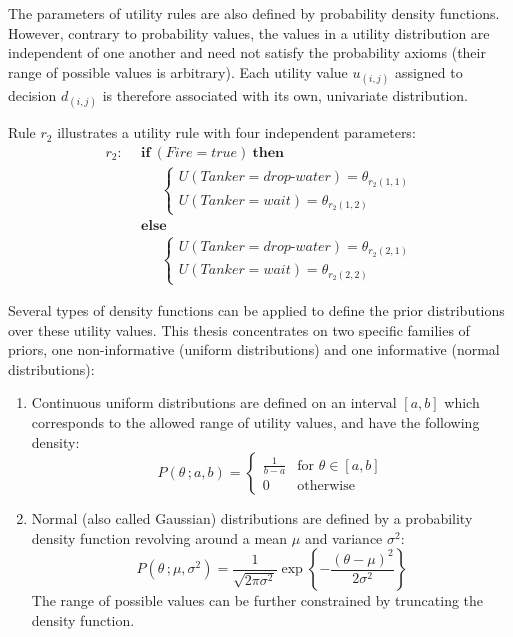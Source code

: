 The parameters of utility rules are also defined by probability density functions.  However, contrary to probability values, the values in a utility distribution are independent of one another and need not satisfy the probability axioms (their range of possible values is arbitrary). Each utility value $u_{(i,j)}$ assigned to decision $d_{(i,j)}$ is therefore associated with its own, univariate distribution.

Rule $r_{2}$ illustrates a utility rule with four independent parameters:
\begin{align*}
r_{2}: \ \ & \textbf{if} \ (\mathit{Fire}\!=\!\mathit{true}) \ \textbf{then} \\
& \;\;\;\;\;  \begin{cases}
U(\mathit{Tanker}\!=\!\mathit{drop\mbox{-}water}) = \theta_{r_{2}(1,1)} \\
U(\mathit{Tanker}\!=\!\mathit{wait}) = \theta_{r_{2}(1,2)}
\end{cases} \\
& \textbf{else} \\
& \;\;\;\;\; \begin{cases}
U (\mathit{Tanker}\!=\!\mathit{drop\mbox{-}water}) = \theta_{r_{2}(2,1)} \\
U(\mathit{Tanker}\!=\!\mathit{wait}) = \theta_{r_{2}(2,2)}
\end{cases}
\end{align*}

Several types of density functions can be applied to define the prior distributions over these utility values.  This thesis concentrates on two specific families of priors, one non-informative (uniform distributions) and one informative (normal distributions): 
\begin{enumerate}
\item Continuous uniform distributions are defined on an interval $[a,b]$ which corresponds to the allowed range of utility values, and have the following density:
\begin{equation}
P(\theta\,; a, b) = \begin{cases}
\frac{1}{b - a} & \text{for } \theta \in [a,b]  \\
0               & \text{otherwise}
\end{cases}
\end{equation}

\item Normal (also called Gaussian) distributions are defined by a probability density function revolving around a mean $\mu$ and variance $\sigma^2$:
\begin{equation}
P(\theta\,; \mu, \sigma^2) = \frac{1}{\sqrt{2\pi\sigma^2}}\operatorname{exp}\left\{-\frac{\left(\theta-\mu\right)^2}{2\sigma^2}\right\}
\end{equation}
The range of possible values can be further constrained by truncating the density function.

\end{enumerate}

